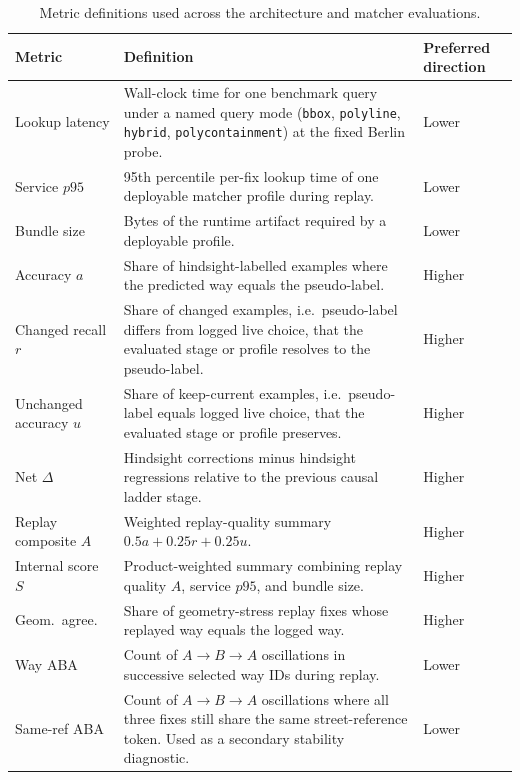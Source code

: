\documentclass{article}
\begin{document}
\begin{table}[!htbp]
\centering
\scriptsize
\caption{Metric definitions used across the architecture and matcher evaluations.}
\label{tab:metric_definitions}
\begin{tabular}{p{2.3cm}p{6.1cm}p{1.9cm}}
\toprule
Metric & Definition & Preferred direction \\
\midrule
Lookup latency & Wall-clock time for one benchmark query under a named query mode (\texttt{bbox}, \texttt{polyline}, \texttt{hybrid}, \texttt{polycontainment}) at the fixed Berlin probe. & Lower \\
Service \(p95\) & 95th percentile per-fix lookup time of one deployable matcher profile during replay. & Lower \\
Bundle size & Bytes of the runtime artifact required by a deployable profile. & Lower \\
Accuracy \(a\) & Share of hindsight-labelled examples where the predicted way equals the pseudo-label. & Higher \\
Changed recall \(r\) & Share of changed examples, i.e.\ pseudo-label differs from logged live choice, that the evaluated stage or profile resolves to the pseudo-label. & Higher \\
Unchanged accuracy \(u\) & Share of keep-current examples, i.e.\ pseudo-label equals logged live choice, that the evaluated stage or profile preserves. & Higher \\
Net \(\Delta\) & Hindsight corrections minus hindsight regressions relative to the previous causal ladder stage. & Higher \\
Replay composite \(A\) & Weighted replay-quality summary \(0.5a + 0.25r + 0.25u\). & Higher \\
Internal score \(S\) & Product-weighted summary combining replay quality \(A\), service \(p95\), and bundle size. & Higher \\
Geom.\ agree. & Share of geometry-stress replay fixes whose replayed way equals the logged way. & Higher \\
Way ABA & Count of \(A \to B \to A\) oscillations in successive selected way IDs during replay. & Lower \\
Same-ref ABA & Count of \(A \to B \to A\) oscillations where all three fixes still share the same street-reference token. Used as a secondary stability diagnostic. & Lower \\
\bottomrule
\end{tabular}
\end{table}
\end{document}
